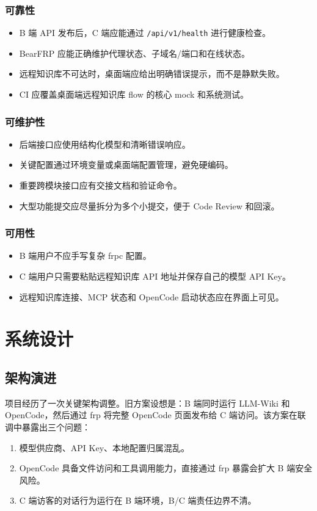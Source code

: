 \documentclass[UTF8,a4paper,12pt,fontset=fandol]{ctexart}
\newcommand{\code}[1]{\begingroup\urlstyle{tt}\footnotesize\nolinkurl{#1}\endgroup}
\begin{document}
\subsubsection{可靠性}
\begin{itemize}
  \item B 端 API 发布后，C 端应能通过 \code{/api/v1/health} 进行健康检查。
  \item BearFRP 应能正确维护代理状态、子域名/端口和在线状态。
  \item 远程知识库不可达时，桌面端应给出明确错误提示，而不是静默失败。
  \item CI 应覆盖桌面端远程知识库 flow 的核心 mock 和系统测试。
\end{itemize}

\subsubsection{可维护性}
\begin{itemize}
  \item 后端接口应使用结构化模型和清晰错误响应。
  \item 关键配置通过环境变量或桌面端配置管理，避免硬编码。
  \item 重要跨模块接口应有交接文档和验证命令。
  \item 大型功能提交应尽量拆分为多个小提交，便于 Code Review 和回滚。
\end{itemize}

\subsubsection{可用性}
\begin{itemize}
  \item B 端用户不应手写复杂 frpc 配置。
  \item C 端用户只需要粘贴远程知识库 API 地址并保存自己的模型 API Key。
  \item 远程知识库连接、MCP 状态和 OpenCode 启动状态应在界面上可见。
\end{itemize}

\section{系统设计}

\subsection{架构演进}
项目经历了一次关键架构调整。旧方案设想是：B 端同时运行 LLM-Wiki 和 OpenCode，然后通过 frp 将完整 OpenCode 页面发布给 C 端访问。该方案在联调中暴露出三个问题：
\begin{enumerate}
  \item 模型供应商、API Key、本地配置归属混乱。
  \item OpenCode 具备文件访问和工具调用能力，直接通过 frp 暴露会扩大 B 端安全风险。
  \item C 端访客的对话行为运行在 B 端环境，B/C 端责任边界不清。
\end{enumerate}
\end{document}
